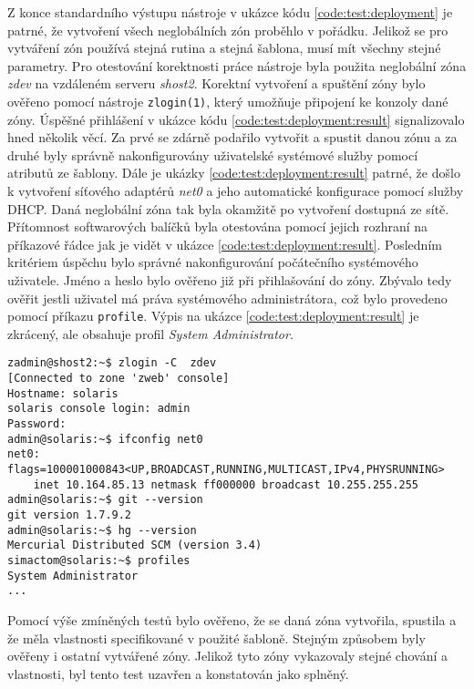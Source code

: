 Z konce standardního výstupu nástroje v ukázce kódu \ref{code:test:deployment} je patrné, že vytvoření všech neglobálních zón
proběhlo v pořádku. Jelikož se pro vytváření zón používá stejná rutina a stejná šablona, musí mít všechny stejné parametry.
Pro otestování korektnosti práce nástroje byla použita neglobální zóna \textit{zdev} na vzdáleném serveru \textit{shost2}.
Korektní vytvoření a spuštění zóny bylo ověřeno pomocí nástroje \verb|zlogin(1)|, který umožňuje připojení ke konzoly dané
zóny. Úspěšné přihlášení v ukázce kódu \ref{code:test:deployment:result} signalizovalo hned několik věcí. Za prvé se zdárně
podařilo vytvořit a spustit danou zónu a za druhé byly správně nakonfigurovány uživatelské systémové služby pomocí atributů ze šablony.
Dále je ukázky \ref{code:test:deployment:result} patrné, že došlo k vytvoření síťového adaptérů \textit{net0} a jeho automatické
konfigurace pomocí služby DHCP. Daná neglobální zóna tak byla okamžitě po vytvoření dostupná ze sítě. Přítomnost softwarových
balíčků byla otestována pomocí jejich rozhraní na příkazové řádce jak je vidět v ukázce \ref{code:test:deployment:result}.
Posledním kritériem úspěchu bylo správné nakonfigurování počátečního systémového uživatele. Jméno a heslo bylo ověřeno již
při přihlašování do zóny. Zbývalo tedy ověřit jestli uživatel má práva systémového administrátora, což bylo provedeno pomocí
příkazu \verb|profile|. Výpis na ukázce \ref{code:test:deployment:result} je zkrácený, ale obsahuje profil \textit{System Administrator}.
\begin{lstlisting}[basicstyle=\scriptsize\ttfamily, caption={Ověření správného vytvoření zóny}, float,label={code:test:deployment:result}]  
zadmin@shost2:~$ zlogin -C  zdev
[Connected to zone 'zweb' console]
Hostname: solaris
solaris console login: admin
Password:
admin@solaris:~$ ifconfig net0
net0: flags=100001000843<UP,BROADCAST,RUNNING,MULTICAST,IPv4,PHYSRUNNING>
    inet 10.164.85.13 netmask ff000000 broadcast 10.255.255.255
admin@solaris:~$ git --version
git version 1.7.9.2
admin@solaris:~$ hg --version
Mercurial Distributed SCM (version 3.4)
simactom@solaris:~$ profiles
System Administrator
...
\end{lstlisting}

Pomocí výše zmíněných testů bylo ověřeno, že se daná zóna vytvořila, spustila a že měla vlastnosti specifikované v použité šabloně.
Stejným způsobem byly ověřeny i ostatní vytvářené zóny. Jelikož tyto zóny vykazovaly stejné chování a vlastnosti, byl tento
test uzavřen a konstatován jako splněný.
